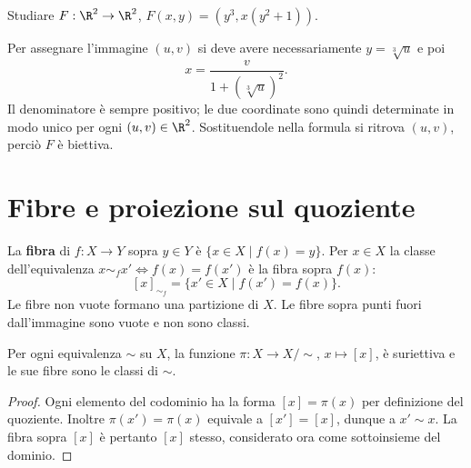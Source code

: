 \begin{esercizio}
Studiare $F:\R^2\to\R^2$, $F(x,y)=(y^3,x(y^2+1))$.
\end{esercizio}
\begin{svolgimento}
Per assegnare l'immagine $(u,v)$ si deve avere necessariamente $y=\sqrt[3]u$ e poi
\[
x=\frac{v}{1+(\sqrt[3]u)^2}.
\]
Il denominatore è sempre positivo; le due coordinate sono quindi determinate in modo unico per ogni $(u,v)\in\R^2$. Sostituendole nella formula si ritrova $(u,v)$, perciò $F$ è biettiva.
\end{svolgimento}

\section{Fibre e proiezione sul quoziente}
\begin{definizione}
La \textbf{fibra} di $f:X\to Y$ sopra $y\in Y$ è $\{x\in X\mid f(x)=y\}$. Per $x\in X$ la classe dell'equivalenza $x\sim_f x'\iff f(x)=f(x')$ è la fibra sopra $f(x)$:
\[
[x]_{\sim_f}=\{x'\in X\mid f(x')=f(x)\}.
\]
Le fibre non vuote formano una partizione di $X$. Le fibre sopra punti fuori dall'immagine sono vuote e non sono classi.
\end{definizione}

\begin{schema}
\end{schema}

\begin{proposizione}
Per ogni equivalenza $\sim$ su $X$, la funzione $\pi:X\to X/{\sim}$, $x\mapsto[x]$, è suriettiva e le sue fibre sono le classi di $\sim$.
\end{proposizione}
\begin{proof}
Ogni elemento del codominio ha la forma $[x]=\pi(x)$ per definizione del quoziente. Inoltre $\pi(x')=\pi(x)$ equivale a $[x']=[x]$, dunque a $x'\sim x$. La fibra sopra $[x]$ è pertanto $[x]$ stesso, considerato ora come sottoinsieme del dominio.
\end{proof}

